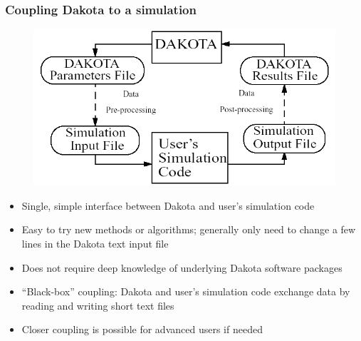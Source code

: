 \documentclass[t]{beamer}
\begin{document}
\begin{frame}
  \frametitle{Coupling Dakota to a simulation}
  \begin{figure}
    \includegraphics[scale=0.3]{images/blackbox.png}
  \end{figure}
  \begin{itemize}
    \item Single, simple interface between Dakota and user's simulation code
    \item Easy to try new methods or algorithms; generally only need to change a
          few lines in the Dakota text input file
    \item Does not require deep knowledge of underlying Dakota software packages
    \item ``Black-box'' coupling: Dakota and user's simulation code
          exchange data by reading and writing short text files
    \item Closer coupling is possible for advanced users if needed
  \end{itemize}
\end{frame}

\end{document}
